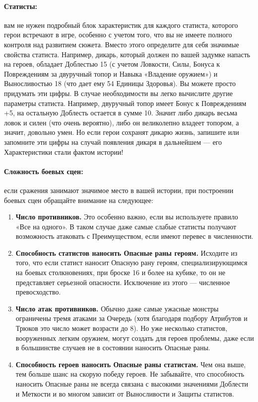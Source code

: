 \paragraph{Статисты:} вам не нужен подробный блок характеристик для каждого статиста, которого герои встречают в игре, особенно с учетом того, что вы не имеете полного контроля над развитием сюжета. Вместо этого определите для себя значимые свойства статиста. Например, дикарь, который должен по вашей задумке напасть на героев, обладает Доблестью 15 (с учетом Ловкости, Силы, Бонуса к Повреждениям за двуручный топор и Навыка «Владение оружием») и Выносливостью 18 (что дает ему 54 Единицы Здоровья). Вы можете просто придумать эти цифры. В случае необходимости вы легко вычислите другие параметры статиста. Например, двуручный топор имеет Бонус к Повреждениям +5, на остальную Доблесть остается в сумме 10. Значит либо дикарь весьма ловок и силен (что очень вероятно), либо он великолепно владеет топором, а значит, довольно умен. Но если герои сохранят дикарю жизнь, запишите или запомните эти цифры на случай появления дикаря в дальнейшем — его Характеристики стали фактом истории!
\paragraph{Сложность боевых сцен:} если сражения занимают значимое место в вашей истории, при построении боевых сцен обращайте внимание на следующее:
\begin{enumerate}
\item \textbf{Число противников.} Это особенно важно, если вы используете правило «Все на одного». В таком случае даже самые слабые статисты получают возможность атаковать с Преимуществом, если имеют перевес в численности.
\item \textbf{Способность статистов наносить Опасные раны героям.} Исходите из того, что если статист наносит Опасную рану героям, специализирующимся на боевых столкновениях, при броске 16 и более на кубике, то он не представляет серьезной опасности.
Исключение из этого — численное превосходство.
\item \textbf{Число атак противников.} Обычно даже самые ужасные монстры ограничены тремя атаками за Очередь (хотя благодаря подбору Атрибутов и Трюков это число может возрасти до 8). Но уже несколько статистов, вооруженных легким оружием, могут создать для героев проблемы, даже если в большинстве случаев не в состоянии наносить Опасные раны.
\item \textbf{Способность героев наносить Опасные раны статистам.} Чем она выше, тем больше шанс на скорую победу героев. Не забывайте, что способность наносить Опасные раны не всегда связана с высокими значениями Доблести и Меткости и во многом зависит от Выносливости и Защиты статистов.
\end{enumerate}